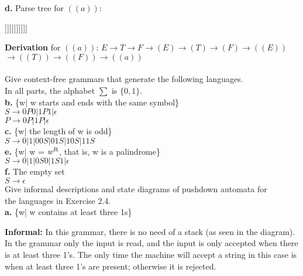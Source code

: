 \documentclass[12pt]{article}
\begin{document}
\pagebreak
\textbf{d.} Parse tree for $((a))$: \\
\begin{center}
	\begin{forest}
		[E [T [F [(E) [(T) [(F) [((E)) [((T)) [((F)) [a]]]]]]]]]]]
	\end{forest}
\end{center}

\textbf{Derivation} for $((a))$:  $E \rightarrow T \rightarrow F \rightarrow (E) \rightarrow (T) \rightarrow (F) \rightarrow ((E)) $  \\
$ \rightarrow ((T)) \rightarrow ((F)) \rightarrow ((a)) $ \\


 \\
Give context-free grammars that generate the following languages. \\
In all parts, the alphabet $\sum$ is $\{0,1\}$. \\

\textbf{b.} \{w| w starts and ends with the same symbol\} \\
$ S \rightarrow 0P0|1P1| \epsilon $ \\
$ P \rightarrow 0P|1P| \epsilon $ \\

\textbf{c.} \{w| the length of w is odd\} \\
$ S \rightarrow 0|1|00S|01S|10S|11S $ \\

\textbf{e.} \{w| w = $w\textsuperscript{R}$, that is, w is a palindrome\} \\
$ S \rightarrow 0|1|0S0|1S1| \epsilon $ \\

\textbf{f.} The empty set \\
$ S \rightarrow \epsilon $ \\


 Give informal descriptions and state diagrams of pushdown automata for \\
the languages in Exercise 2.4. \\

\textbf{a.} \{w| w contains at least three 1s\}

\textbf{Informal:} In this grammar, there is no need of a stack (as seen in the diagram). In the grammar only the input is read, and the input is only accepted when there is at least three 1's. The only time the machine will accept a string in this case is when at least three 1's are present; otherwise it is rejected.
\end{document}
